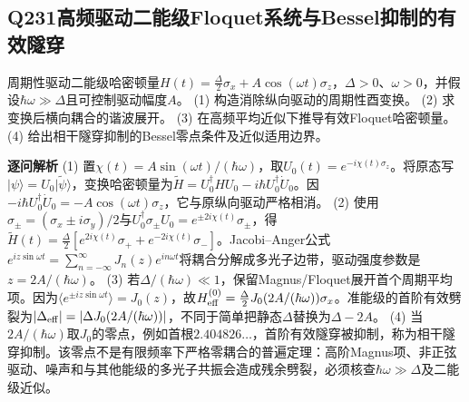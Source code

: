 \subsection*{Q231\quad 高频驱动二能级Floquet系统与Bessel抑制的有效隧穿}
周期性驱动二能级哈密顿量$H(t)=\frac\Delta2\sigma_x+A\cos(\omega t)\sigma_z$，$\Delta>0$、$\omega>0$，并假设$\hbar\omega\gg\Delta$且可控制驱动幅度$A$。
(1) 构造消除纵向驱动的周期性酉变换。
(2) 求变换后横向耦合的谐波展开。
(3) 在高频平均近似下推导有效Floquet哈密顿量。
(4) 给出相干隧穿抑制的Bessel零点条件及近似适用边界。
\par\textbf{逐问解析}
(1) 置$\chi(t)=A\sin(\omega t)/(\hbar\omega)$，取$U_0(t)=e^{-i\chi(t)\sigma_z}$。将原态写$|\psi\rangle=U_0|\widetilde\psi\rangle$，变换哈密顿量为$\widetilde H=U_0^\dagger HU_0-i\hbar U_0^\dagger\dot U_0$。因$-i\hbar U_0^\dagger\dot U_0=-A\cos(\omega t)\sigma_z$，它与原纵向驱动严格相消。
(2) 使用$\sigma_\pm=(\sigma_x\pm i\sigma_y)/2$与$U_0^\dagger\sigma_\pm U_0=e^{\pm 2i\chi(t)}\sigma_\pm$，得$\widetilde H(t)=\frac\Delta2[e^{2i\chi(t)}\sigma_++e^{-2i\chi(t)}\sigma_-]$。Jacobi–Anger公式$e^{iz\sin\omega t}=\sum_{n=-\infty}^\infty J_n(z)e^{in\omega t}$将耦合分解成多光子边带，驱动强度参数是$z=2A/(\hbar\omega)$。
(3) 若$\Delta/(\hbar\omega)\ll1$，保留Magnus/Floquet展开首个周期平均项。因为$\langle e^{\pm iz\sin\omega t}\rangle=J_0(z)$，故$H_{\rm eff}^{(0)}=\frac\Delta2J_0(2A/(\hbar\omega))\sigma_x$。准能级的首阶有效劈裂为$|\Delta_{\rm eff}|=|\Delta J_0(2A/(\hbar\omega))|$，不同于简单把静态$\Delta$替换为$\Delta-2A$。
(4) 当$2A/(\hbar\omega)$取$J_0$的零点，例如首根$2.404826\ldots$，首阶有效隧穿被抑制，称为相干隧穿抑制。该零点不是有限频率下严格零耦合的普遍定理：高阶Magnus项、非正弦驱动、噪声和与其他能级的多光子共振会造成残余劈裂，必须核查$\hbar\omega\gg\Delta$及二能级近似。
\par\medskip
